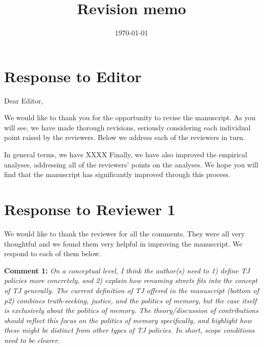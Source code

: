 \documentclass[12pt, a4paper, notitlepage]{article}
\title{\Large \textbf{Revision memo}\\\vspace{10pt}{\large `Do TJ policies cause backlash? Evidence from street name changes in Spain', submitted to Research \& Politics (Manuscript ID RAP-21-0006)}}
\author{}
\date{\large \today}
\begin{document}
\maketitle


\section*{Response to Editor}

Dear Editor,

We would like to thank you for the opportunity to revise the manuscript. As you will see, we have made thorough revisions, seriously considering each individual point raised by the reviewers. Below we address each of the reviewers in turn.

In general terms, we have  XXXX
Finally, we have also improved the empirical analyses, addressing all of the reviewers' points on the analyses. We hope you will find that the manuscript has significantly improved through this process.\\ [1ex]


\newpage

\section*{Response to Reviewer 1}

We would like to thank the reviewer for all the comments. They were all very thoughtful and we found them very helpful in improving the manuscript. We respond to each of them below.

\textbf{Comment 1:} \textit{On a conceptual level, I think the author(s) need to 1) define TJ policies more concretely, and 2) explain how renaming streets fits into the concept of TJ generally. The current definition of TJ offered in the manuscript (bottom of p2) combines truth-seeking, justice, and the politics of memory, but the case itself is exclusively about the politics of memory. The theory/discussion of contributions should reflect this focus on the politics of memory specifically, and highlight how these might be distinct from other types of TJ policies. In short, scope conditions need to be clearer.}
\end{document}
